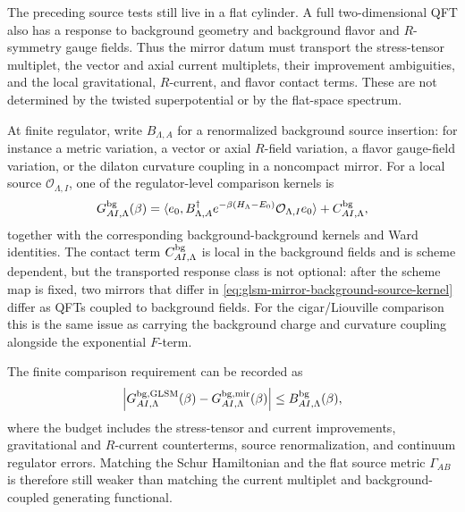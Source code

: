 \begin{remark}
\label{rem:glsm-mirror-background-response-obligation}
The preceding source tests still live in a flat cylinder.  A full
two-dimensional QFT also has a response to background geometry and background
flavor and \(R\)-symmetry gauge fields.  Thus the mirror datum must transport
the stress-tensor multiplet, the vector and axial current multiplets, their
improvement ambiguities, and the local gravitational, \(R\)-current, and
flavor contact terms.  These are not determined by the twisted
superpotential or by the flat-space spectrum.

At finite regulator, write \(B_{\Lambda,A}\) for a renormalized background
source insertion: for instance a metric variation, a vector or axial
\(R\)-field variation, a flavor gauge-field variation, or the dilaton
curvature coupling in a noncompact mirror.  For a local source
\({\mathcal O}_{\Lambda,I}\), one of the regulator-level comparison kernels is
\begin{equation}
  G^{\rm bg}_{A I,\Lambda}(\beta)
  =
  \langle e_0,
    B_{\Lambda,A}^{\dagger}
    e^{-\beta(H_\Lambda-E_0)}
    {\mathcal O}_{\Lambda,I}
  e_0\rangle
  +C^{\rm bg}_{A I,\Lambda},
  \label{eq:glsm-mirror-background-source-kernel}
\end{equation}
together with the corresponding background-background kernels and Ward
identities.  The contact term \(C^{\rm bg}_{A I,\Lambda}\) is local in the
background fields and is scheme dependent, but the transported response
class is not optional: after the scheme map is fixed, two mirrors that differ
in \eqref{eq:glsm-mirror-background-source-kernel} differ as QFTs coupled to
background fields.  For the cigar/Liouville comparison this is the same
issue as carrying the background charge and curvature coupling alongside the
exponential \(F\)-term.

The finite comparison requirement can be recorded as
\begin{equation}
  \left|
    G^{\rm bg,GLSM}_{A I,\Lambda}(\beta)
    -
    G^{\rm bg,mir}_{A I,\Lambda}(\beta)
  \right|
  \le
  B^{\rm bg}_{A I,\Lambda}(\beta),
  \label{eq:glsm-mirror-background-response-bound}
\end{equation}
where the budget includes the stress-tensor and current improvements,
gravitational and \(R\)-current counterterms, source renormalization, and
continuum regulator errors.  Matching the Schur Hamiltonian and the flat
source metric \(\Gamma_{AB}\) is therefore still weaker than matching the
current multiplet and background-coupled generating functional.
\end{remark}

